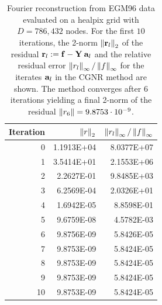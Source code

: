 \begin{example}
		\begin{table}[ht]
		  \begin{center}
         \begin{tabular}{r|r|r}
         Iteration & $\left\|r\right\|_{2}$ & $\left\|r_{l}\right\|_{\infty}/\left\|f\right\|_{\infty}$ \\[0.7ex] \hline
                 0 &    1.1913E+04 &        8.0377E+07 \\
                 1 &    3.5414E+01 &        2.1553E+06 \\
                 2 &    2.2627E-01 &        9.8485E+03 \\
                 3 &    6.2569E-04 &        2.0326E+01 \\
                 4 &    1.6942E-05 &        8.8598E-01 \\
                 5 &    9.6759E-08 &        4.5782E-03 \\
                 6 &    9.8756E-09 &        5.8426E-05 \\
                 7 &    9.8753E-09 &        5.8424E-05 \\
                 8 &    9.8753E-09 &        5.8424E-05 \\
                 9 &    9.8753E-09 &        5.8424E-05 \\
                10 &    9.8753E-09 &        5.8424E-05 \\
        \end{tabular}
		  \end{center}
		  \caption{Fourier reconstruction from EGM96 data evaluated on a healpix grid with $D=786,432$ nodes. 
		  For the first $10$ iterations, the 2-norm $\left\|\mathbf{r}_{l}\right\|_{2}$ of the residual $\mathbf{r}_{l} := \mathbf{f} - 
		  \mathbf{Y}\:\mathbf{a}_{l}$ and the relative residual error $\left\|r_{l}\right\|_{\infty}/\left\|f\right\|_{\infty}$ 
		  for the iterates $\mathbf{a}_{l}$ in the CGNR method are shown. The method converges after $6$ iterations
		  yielding a final 2-norm of the residual $\left\|r_{6}\right\| = 9.8753 \cdot 10^{-9}$.}
		  \label{tab:Healpix}
		\end{table}
		
  \end{example}
  
